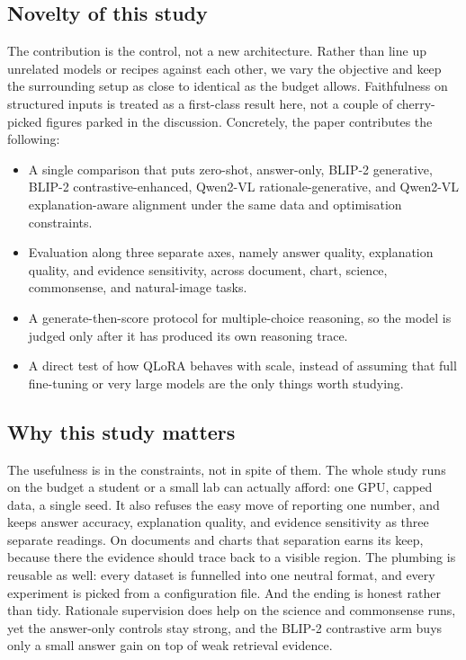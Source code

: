 \documentclass[preprint,12pt]{elsarticle}
\begin{document}
\subsection{Novelty of this study}
The contribution is the control, not a new architecture.
Rather than line up unrelated models or recipes against each other, we vary the objective and keep the surrounding setup as close to identical as the budget allows.
Faithfulness on structured inputs is treated as a first-class result here, not a couple of cherry-picked figures parked in the discussion.
Concretely, the paper contributes the following:

\begin{itemize}
    \item A single comparison that puts zero-shot, answer-only, BLIP-2 generative, BLIP-2 contrastive-enhanced, Qwen2-VL rationale-generative, and Qwen2-VL explanation-aware alignment under the same data and optimisation constraints.
    \item Evaluation along three separate axes, namely answer quality, explanation quality, and evidence sensitivity, across document, chart, science, commonsense, and natural-image tasks.
    \item A generate-then-score protocol for multiple-choice reasoning, so the model is judged only after it has produced its own reasoning trace.
    \item A direct test of how QLoRA behaves with scale, instead of assuming that full fine-tuning or very large models are the only things worth studying.
\end{itemize}

\subsection{Why this study matters}
The usefulness is in the constraints, not in spite of them.
The whole study runs on the budget a student or a small lab can actually afford: one GPU, capped data, a single seed.
It also refuses the easy move of reporting one number, and keeps answer accuracy, explanation quality, and evidence sensitivity as three separate readings.
On documents and charts that separation earns its keep, because there the evidence should trace back to a visible region.
The plumbing is reusable as well: every dataset is funnelled into one neutral format, and every experiment is picked from a configuration file.
And the ending is honest rather than tidy.
Rationale supervision does help on the science and commonsense runs, yet the answer-only controls stay strong, and the BLIP-2 contrastive arm buys only a small answer gain on top of weak retrieval evidence.
\end{document}
